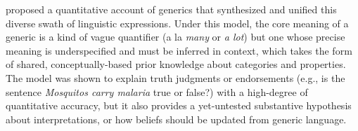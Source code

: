 \documentclass[floatsintext,doc]{apa6}
\begin{document}
 proposed a quantitative account of generics that synthesized and unified this diverse swath of linguistic expressions. 
Under this model, the core meaning of a generic is a kind of vague quantifier (a la \emph{many} or \emph{a lot}) but one whose precise meaning is underspecified and must be inferred in context, which takes the form of shared, conceptually-based prior knowledge about categories and properties. 
The model was shown to explain truth judgments or endorsements (e.g., is the sentence \emph{Mosquitos carry malaria} true or false?) with a high-degree of quantitative accuracy, but it also provides a yet-untested substantive hypothesis about interpretations, or how beliefs should be updated from generic language. 




\end{document}
